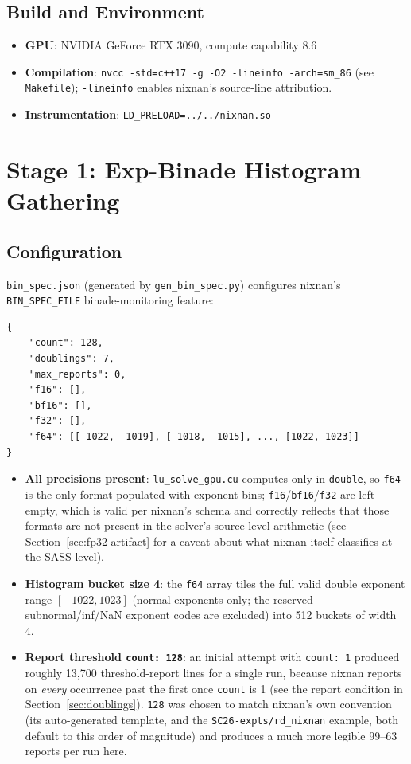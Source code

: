\documentclass[11pt,a4paper]{article}
\begin{document}
\subsection{Build and Environment}
\begin{itemize}
  \item \textbf{GPU}: NVIDIA GeForce RTX 3090, compute capability 8.6
  \item \textbf{Compilation}: \texttt{nvcc -std=c++17 -g -O2 -lineinfo -arch=sm\_86}
    (see \texttt{Makefile}); \texttt{-lineinfo} enables nixnan's
    source-line attribution.
  \item \textbf{Instrumentation}: \texttt{LD\_PRELOAD=../../nixnan.so}
\end{itemize}

\section{Stage 1: Exp-Binade Histogram Gathering}
\label{sec:binade}

\subsection{Configuration}

\texttt{bin\_spec.json} (generated by \texttt{gen\_bin\_spec.py}) configures
nixnan's \texttt{BIN\_SPEC\_FILE} binade-monitoring feature:

\begin{lstlisting}
{
    "count": 128,
    "doublings": 7,
    "max_reports": 0,
    "f16": [],
    "bf16": [],
    "f32": [],
    "f64": [[-1022, -1019], [-1018, -1015], ..., [1022, 1023]]
}
\end{lstlisting}

\begin{itemize}
  \item \textbf{All precisions present}: \texttt{lu\_solve\_gpu.cu} computes
    only in \texttt{double}, so \texttt{f64} is the only format populated
    with exponent bins; \texttt{f16}/\texttt{bf16}/\texttt{f32} are left
    empty, which is valid per nixnan's schema and correctly reflects that
    those formats are not present in the solver's source-level arithmetic
    (see Section~\ref{sec:fp32-artifact} for a caveat about what nixnan
    itself classifies at the SASS level).
  \item \textbf{Histogram bucket size 4}: the \texttt{f64} array tiles the
    full valid double exponent range $[-1022, 1023]$ (normal exponents
    only; the reserved subnormal/inf/NaN exponent codes are excluded) into
    512 buckets of width 4.
  \item \textbf{Report threshold \texttt{count: 128}}: an initial attempt
    with \texttt{count: 1} produced roughly 13{,}700 threshold-report lines
    for a single run, because nixnan reports on \emph{every} occurrence past
    the first once \texttt{count} is 1 (see the report condition in
    Section~\ref{sec:doublings}). \texttt{128} was chosen to match nixnan's
    own convention (its auto-generated template, and the
    \texttt{SC26-expts/rd\_nixnan} example, both default to this order of
    magnitude) and produces a much more legible 99--63 reports per run here.
\end{itemize}
\end{document}
